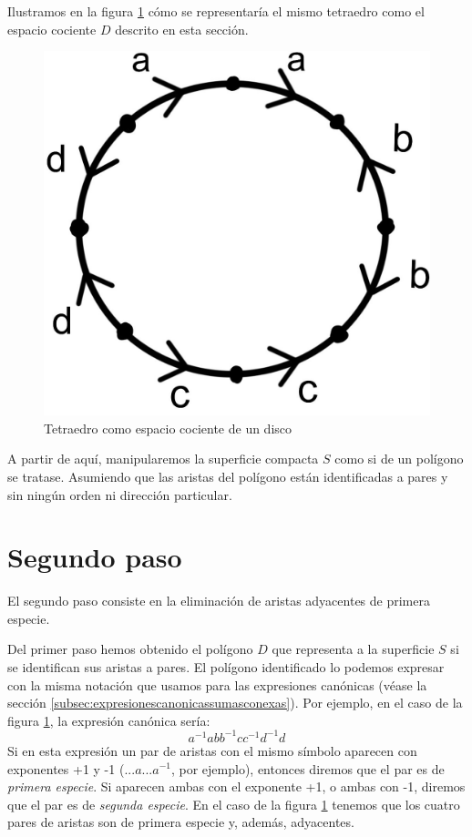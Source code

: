 \documentclass[a4paper,11pt,spanish, twoside, leqno]{tfg-uam}
\theoremstyle{definition}
\begin{document}
Ilustramos en la figura \ref{fig:d} cómo se representaría el mismo tetraedro como el espacio cociente $D$ descrito en esta sección.

\begin{figure}[h!]
	\centering
	\includegraphics[width=0.3\linewidth]{imagenes/d.jpeg}
	\caption{Tetraedro como espacio cociente de un disco}
	\label{fig:d}
\end{figure}

A partir de aquí, manipularemos la superficie compacta $S$ como si de un polígono se tratase. Asumiendo que las aristas del polígono están identificadas a pares y sin ningún orden ni dirección particular.


\section{Segundo paso}

El segundo paso consiste en la eliminación de aristas adyacentes de primera especie.

Del primer paso hemos obtenido el polígono $D$ que representa a la superficie $S$ si se identifican sus aristas a pares. El polígono identificado lo podemos expresar con la misma notación que usamos para las expresiones canónicas (véase la sección \ref{subsec:expresionescanonicassumasconexas}). Por ejemplo, en el caso de la figura \ref{fig:d}, la expresión canónica sería:
\[ a^{-1}abb^{-1}cc^{-1}d^{-1}d \]
Si en esta expresión un par de aristas con el mismo símbolo aparecen  con exponentes +1 y -1 ($...a...a^{-1}$, por ejemplo), entonces diremos que el par es de \textit{primera especie}. Si aparecen ambas con el exponente +1, o ambas con -1, diremos que el par es de \textit{segunda especie}. En el caso de la figura \ref{fig:d} tenemos que los cuatro pares de aristas son de primera especie y, además, adyacentes.
\end{document}
